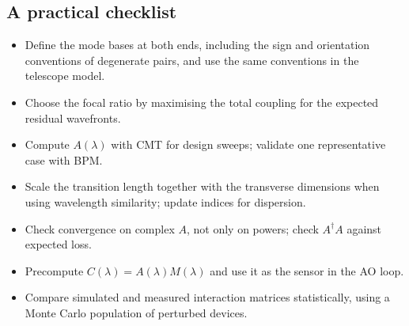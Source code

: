 \documentclass[11pt,a4paper]{article}
\begin{document}
\subsection{A practical checklist}
\begin{itemize}
\item Define the mode bases at both ends, including the sign and orientation conventions of degenerate pairs, and use the same conventions in the telescope model.
\item Choose the focal ratio by maximising the total coupling for the expected residual wavefronts.
\item Compute $A(\lambda)$ with CMT for design sweeps; validate one representative case with BPM.
\item Scale the transition length together with the transverse dimensions when using wavelength similarity; update indices for dispersion.
\item Check convergence on complex $A$, not only on powers; check $A^\dagger A$ against expected loss.
\item Precompute $C(\lambda) = A(\lambda)M(\lambda)$ and use it as the sensor in the AO loop.
\item Compare simulated and measured interaction matrices statistically, using a Monte Carlo population of perturbed devices.
\end{itemize}

\end{document}
